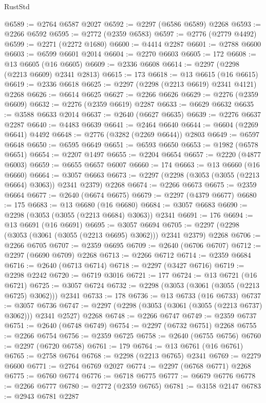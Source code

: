 \begin{lexlean}{RustStd}
\begin{coremodule}
@6589 := @2764 @6587 @2027
@6592 := @2297 (@6586 @6589) @2268
@6593 := @2266 @6592
@6595 := @2772 (@2359 @6583)
@6597 := @2776 (@2779 @4492)
@6599 := @2271 (@2272 @1680)
@6600 := @4414 @2287
@6601 := @2788 @6600
@6603 := @6599 @6601 @2014
@6604 := @2270 @6603
@6605 := 172
@6608 := @13 @6605 (@16 @6605)
@6609 := @2336 @6608
@6614 := @2297 (@2298 (@2213 @6609) @2341 @2813)
@6615 := 173
@6618 := @13 @6615 (@16 @6615)
@6619 := @2336 @6618
@6625 := @2297 (@2298 (@2213 @6619) @2341 @4121) @2268
@6626 := @6614 @6625
@6627 := @2266 @6626
@6629 := @2276 (@2359 @6609)
@6632 := @2276 (@2359 @6619) @2287
@6633 := @6629 @6632
@6635 := @3588 @6633 @2014
@6637 := @2640 (@6627 @6635)
@6639 := @2276 @6637 @2287
@6640 := @4483 @6639
@6641 := @2464 @6640
@6644 := @6604 (@2269 @6641) @4492
@6648 := @2776 (@3282 (@2269 @6644)) @2803
@6649 := @6597 @6648
@6650 := @6595 @6649
@6651 := @6593 @6650
@6653 := @1982 (@6578 @6651)
@6654 := @2207 @1497
@6655 := @2204 @6654
@6657 := @2220 (@4877 @6003)
@6659 := @6655 @6657 @6007
@6660 := 174
@6663 := @13 @6660 (@16 @6660)
@6664 := @3057 @6663
@6673 := @2297 (@2298 (@3053 (@3055 (@2213 @6664) @3063)) @2341 @2379) @2268
@6674 := @2266 @6673
@6675 := @2359 @6664
@6677 := @2640 (@6674 @6675)
@6679 := @2297 (@4379 @6677)
@6680 := 175
@6683 := @13 @6680 (@16 @6680)
@6684 := @3057 @6683
@6690 := @2298 (@3053 (@3055 (@2213 @6684) @3063)) @2341
@6691 := 176
@6694 := @13 @6691 (@16 @6691)
@6695 := @3057 @6694
@6705 := @2297 (@2298 (@3053 (@3061 (@3055 (@2213 @6695) @3062))) @2341 @2379) @2268
@6706 := @2266 @6705
@6707 := @2359 @6695
@6709 := @2640 (@6706 @6707)
@6712 := @2297 (@6690 @6709) @2268
@6713 := @2266 @6712
@6714 := @2359 @6684
@6716 := @2640 (@6713 @6714)
@6718 := @2297 (@3427 @6716)
@6719 := @2298 @2242
@6720 := @6719 @3016
@6721 := 177
@6724 := @13 @6721 (@16 @6721)
@6725 := @3057 @6724
@6732 := @2298 (@3053 (@3061 (@3055 (@2213 @6725) @3062))) @2341
@6733 := 178
@6736 := @13 @6733 (@16 @6733)
@6737 := @3057 @6736
@6747 := @2297 (@2298 (@3053 (@3061 (@3055 (@2213 @6737) @3062))) @2341 @2527) @2268
@6748 := @2266 @6747
@6749 := @2359 @6737
@6751 := @2640 (@6748 @6749)
@6754 := @2297 (@6732 @6751) @2268
@6755 := @2266 @6754
@6756 := @2359 @6725
@6758 := @2640 (@6755 @6756)
@6760 := @2297 (@6720 @6758)
@6761 := 179
@6764 := @13 @6761 (@16 @6761)
@6765 := @2758 @6764
@6768 := @2298 (@2213 @6765) @2341
@6769 := @2279 @6600
@6771 := @2764 @6769 @2027
@6774 := @2297 (@6768 @6771) @2268
@6775 := @6760 @6774
@6776 := @6718 @6775
@6777 := @6679 @6776
@6778 := @2266 @6777
@6780 := @2772 (@2359 @6765)
@6781 := @3158 @2147
@6783 := @2943 @6781 @2287

\end{coremodule}
\end{lexlean}
